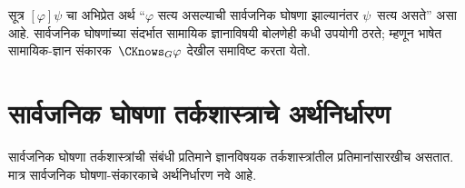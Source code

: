 सूत्र $[\varphi] \psi$ चा अभिप्रेत अर्थ ``$\varphi$ सत्य
असल्याची सार्वजनिक घोषणा झाल्यानंतर $\psi$~सत्य असते''
असा आहे. सार्वजनिक घोषणांच्या संदर्भात सामायिक
ज्ञानाविषयी बोलणेही कधी उपयोगी ठरते; म्हणून भाषेत
सामायिक-ज्ञान संकारक~$\CKnows_G
\varphi$ देखील समाविष्ट करता येतो.













\section{सार्वजनिक घोषणा तर्कशास्त्राचे अर्थनिर्धारण}\label{aml:el:psm:sec}

सार्वजनिक घोषणा तर्कशास्त्रांची संबंधी प्रतिमाने
ज्ञानविषयक तर्कशास्त्रांतील प्रतिमानांसारखीच असतात.
मात्र सार्वजनिक घोषणा-संकारकाचे अर्थनिर्धारण नवे आहे.

